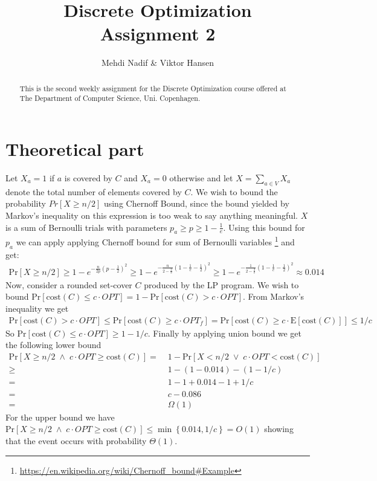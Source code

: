\documentclass[12pt]{article}
\begin{document}
\nocite{*}


\title{Discrete Optimization \\
       Assignment 2}

\author{Mehdi Nadif \& Viktor Hansen}

\maketitle

\begin{abstract}
  This is the second weekly assignment for the Discrete Optimization course offered at The Department of Computer Science, Uni. Copenhagen.
\end{abstract}

\pagebreak

\section*{Theoretical part}
Let $X_a = 1$ if $a$ is covered by $C$ and $X_a=0$ otherwise and let $X=\sum_{a \in V} X_a$ denote the total number of elements covered by $C$. We wish to bound the probability $Pr\left[ X \geq n/2 \right]$ using Chernoff Bound, since the bound yielded by Markov's inequality on this expression is too weak to say anything meaningful. $X$ is a sum of Bernoulli trials with parameters $p_a  \geq p \geq  1-\frac{1}{e}$. Using this bound for $p_a$ we can apply applying Chernoff bound for sum of Bernoulli variables \footnote{\url{https://en.wikipedia.org/wiki/Chernoff_bound\#Example}} and get:
\begin{align*}
\text{Pr}[X \geq n/2] \geq 1 - e^{-\frac{n}{2p}\left( p-\frac{1}{2} \right)^2} \geq 1 - e^{-\frac{n}{2-\frac{2}{e}}\left( 1-\frac{1}{e}-\frac{1}{2} \right)^2} \geq 1 - e^{-\frac{1}{2-\frac{2}{e}}\left( 1-\frac{1}{e}-\frac{1}{2} \right)^2} \approx 0.014
\end{align*}
Now, consider a rounded set-cover $C$ produced by the LP program. We wish to bound $\text{Pr}[\text{cost}(C) \leq c \cdot OPT ] = 1 - \text{Pr}[\text{cost}(C) > c \cdot OPT ] $. From Markov's inequality we get
\begin{align*}
\text{Pr}[\text{cost}(C) > c \cdot OPT ] \leq \text{Pr}[\text{cost}(C) \geq  c \cdot OPT_f ] = \text{Pr}[\text{cost}(C) \geq  c \cdot \text{E}[\text{cost}(C)] ] \leq 1/c
\end{align*}
So  $\text{Pr}[\text{cost}(C) \leq c \cdot OPT ] \geq 1-1/c$. Finally by applying union bound we get the following lower bound
\begin{align*}
\text{Pr}[X \geq n/2 \; \land \; c \cdot OPT \geq \text{cost}(C)] = & \; 1-\text{Pr}[X < n/2 \; \lor \; c \cdot OPT < \text{cost}(C)] \\
\geq &\;1 - (1 - 0.014) - (1-1/c) \\
= & \; 1 - 1 + 0.014 - 1 + 1/c\\
= & \; c-0.086 \\
= & \; \Omega(1)
\end{align*}
For the upper bound we have $\text{Pr}[X \geq n/2 \; \land \; c \cdot OPT \geq \text{cost}(C)]  \leq \min \left\{ 0.014, 1/c \right\} = O(1)$ showing that the event occurs with  probability $\Theta(1)$.
\end{document}
